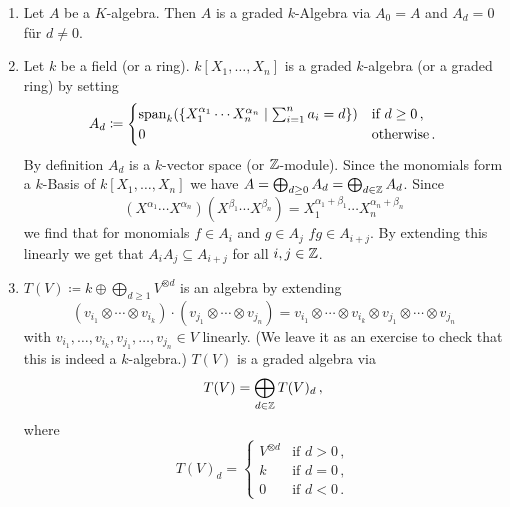 \begin{example}
  \begin{enumerate}[label=\emph{\alph*)},leftmargin=*]
    \item
      Let $A$ be a $K$-algebra.
      Then $A$ is a graded $k$-Algebra via $A_0 = A$ and $A_d = 0$ für $d \neq 0$.
    \item
      Let $k$ be a field (or a ring).
      $k[X_1, \dotsc, X_n]$ is a graded $k$-algebra (or a graded ring) by setting
      \[
                  A_d
        \coloneqq \begin{cases}
                    \operatorname{span}_k(
                              \{X_1^{\alpha_1} \dotsm X_n^{\alpha_n}
                            \mid
                              \sum_{i=1}^n a_i = d\}
                            )
                            & \text{if } d \geq 0 \,, \\
                    0       & \text{otherwise} \,.
                  \end{cases}
      \]
      By definition $A_d$ is a $k$-vector space (or $\mathbb{Z}$-module).
      Since the monomials form a $k$-Basis of $k[X_1, \dotsc, X_n]$ we have $A = \bigoplus_{d \geq 0} A_d = \bigoplus_{d \in \mathbb{Z}} A_d$.
      Since
      \[
          \left( X^{\alpha_1} \dotsm X^{\alpha_n} \right)
          \left( X^{\beta_1} \dotsm X^{\beta_n} \right)
        = X_1^{\alpha_1+\beta_1} \dotsm X_n^{\alpha_n+\beta_n}
      \]
      we find that for monomials $f \in A_i$ and $g \in A_j$ $fg \in A_{i+j}$.
      By extending this linearly we get that $A_i A_j \subseteq A_{i+j}$ for all $i,j \in \mathbb{Z}$.
    \item
      $T(V) \coloneqq k \oplus \bigoplus_{d \geq 1} V^{\otimes d}$ is an algebra by extending
      \[
          (v_{i_1} \otimes \dotsb \otimes v_{i_k}) \cdot (v_{j_1} \otimes \dotsb \otimes v_{j_n})
        = v_{i_1} \otimes \dotsb \otimes v_{i_k} \otimes v_{j_1} \otimes \dotsb \otimes v_{j_n}
      \]
      with $v_{i_1}, \dotsc, v_{i_k}, v_{j_1}, \dotsc, v_{j_n} \in V$ linearly.
      (We leave it as an exercise to check that this is indeed a $k$-algebra.)
      $T(V)$ is a graded algebra via
      \[
          T(V)
        = \bigoplus_{d \in \mathbb{Z}} T(V)_d \,,
      \]
      where
      \[
          T(V)_d
        = \begin{cases}
            V^{\otimes d} & \text{if } d > 0 \,,  \\
            k             & \text{if } d = 0 \,,  \\
            0             & \text{if } d < 0 \,.
          \end{cases}
      \]
  \end{enumerate}
\end{example}


